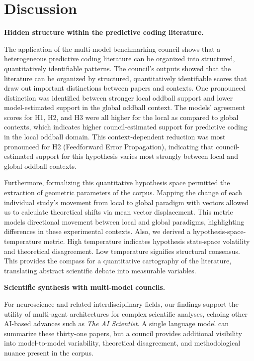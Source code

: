 \documentclass[12pt]{article}
\begin{document}
\section{Discussion}\label{discussion}

\noindent\textbf{Hidden structure within the predictive coding literature.}

The application of the multi-model benchmarking council shows that a heterogeneous predictive coding literature can be organized into structured, quantitatively identifiable patterns. The council's outputs showed that the literature can be organized by structured, quantitatively identifiable scores that draw out important distinctions between papers and contexts. One pronounced distinction was identified between stronger local oddball support and lower model-estimated support in the global oddball context. The models' agreement scores for H1, H2, and H3 were all higher for the local as compared to global contexts, which indicates higher council-estimated support for predictive coding in the local oddball domain. This context-dependent reduction was most pronounced for H2 (Feedforward Error Propagation), indicating that council-estimated support for this hypothesis varies most strongly between local and global oddball contexts.

Furthermore, formalizing this quantitative hypothesis space permitted the extraction of geometric parameters of the corpus. Mapping the change of each individual study's movement from local to global paradigm with vectors allowed us to calculate theoretical shifts via mean vector displacement. This metric models directional movement between local and global paradigms, highlighting differences in these experimental contexts. Also, we derived a hypothesis-space-temperature metric. High temperature indicates hypothesis state-space volatility and theoretical disagreement. Low temperature signifies structural consensus. This provides the compass for a quantitative cartography of the literature, translating abstract scientific debate into measurable variables.

\noindent\textbf{Scientific synthesis with multi-model councils.}

For neuroscience and related interdisciplinary fields, our findings support the utility of multi-agent architectures for complex scientific analyses, echoing other AI-based advances such as \emph{The AI Scientist}\cite{ref45}. A single language model can summarize these thirty-one papers, but a council provides additional visibility into model-to-model variability, theoretical disagreement, and methodological nuance present in the corpus.
\end{document}
